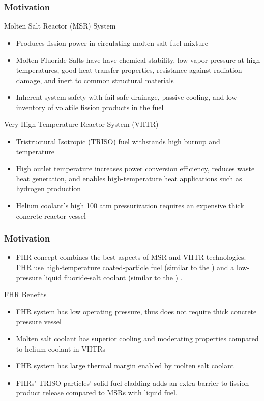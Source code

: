 \begin{frame}
  \frametitle{Motivation}
  \begin{block}{Molten Salt Reactor (MSR) System}
    \begin{itemize}
      \item Produces fission power in circulating molten salt fuel mixture
      \item Molten Fluoride Salts have have chemical stability, low vapor pressure 
      at high temperatures, good heat transfer properties, resistance against 
      radiation damage, and inert to common structural materials
      \item Inherent system safety with fail-safe drainage, passive cooling, and 
      low inventory of volatile fission products in the fuel
    \end{itemize}
  \end{block}
  \begin{block}{Very High Temperature Reactor System (VHTR)}
    \begin{itemize}
      \item Tristructural Isotropic (TRISO) fuel withstands high burnup and 
      temperature
      \item High outlet temperature increases power conversion efficiency, reduces 
      waste heat generation, and enables high-temperature heat applications 
      such as hydrogen production
      \item Helium coolant's high 100 atm pressurization requires an expensive thick
      concrete reactor vessel
    \end{itemize}
  \end{block}
\end{frame}
\begin{frame}
  \frametitle{Motivation}
  \begin{itemize}
    \item \acrlong{FHR} concept combines the best aspects of \acrlong{MSR} and \acrlong{VHTR} technologies. 
      \acrshort{FHR} use high-temperature coated-particle fuel (similar to the ) 
      and a low-pressure liquid fluoride-salt coolant (similar to the )
      \cite{forsberg_fluoride-salt-cooled_2012,facilitators_fluoride-salt-cooled_2013}.
  \end{itemize}
  \begin{block}{\acrfull{FHR} Benefits}
    \begin{itemize}
      \item FHR system has low operating pressure, thus does not require thick 
      concrete pressure vessel 
      \item Molten salt coolant has superior cooling and moderating properties 
      compared to helium coolant in VHTRs
      \item FHR system has large thermal margin enabled by molten salt coolant
      \item FHRs' TRISO particles' solid fuel cladding adds an extra barrier to 
      fission product release compared to MSRs with liquid fuel.
    \end{itemize}
  \end{block}
\end{frame}
